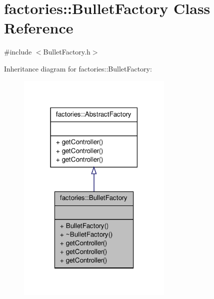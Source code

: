 \hypertarget{classfactories_1_1BulletFactory}{\section{factories\-:\-:\-Bullet\-Factory \-Class \-Reference}
\label{db/db2/classfactories_1_1BulletFactory}
}


{\ttfamily \#include $<$\-Bullet\-Factory.\-h$>$}



\-Inheritance diagram for factories\-:\-:\-Bullet\-Factory\-:
\nopagebreak
\begin{figure}[H]
\begin{center}
\leavevmode
\includegraphics[width=210pt]{d7/d8a/classfactories_1_1BulletFactory__inherit__graph}
\end{center}
\end{figure}



